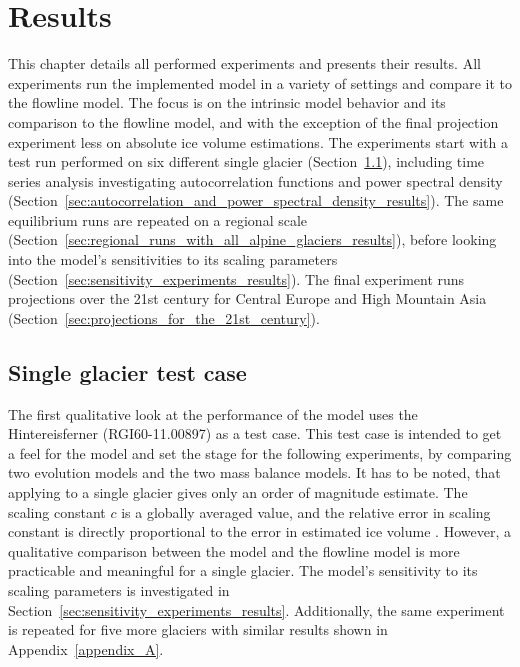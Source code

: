 \chapter{Results}\label{chap:results}
\thispagestyle{plain}

  This chapter details all performed experiments and presents their results. All experiments run the implemented \vas{} model in a variety of settings and compare it to the flowline model. The focus is on the intrinsic model behavior and its comparison to the flowline model, and with the exception of the final projection experiment less on absolute ice volume estimations. The experiments start with a test run performed on six different single glacier (Section~\ref{sec:single_glacier_test_case_results}), including time series analysis investigating autocorrelation functions and power spectral density (Section~\ref{sec:autocorrelation_and_power_spectral_density_results}). The same equilibrium runs are repeated on a regional scale (Section~\ref{sec:regional_runs_with_all_alpine_glaciers_results}), before looking into the model's sensitivities to its scaling parameters (Section~\ref{sec:sensitivity_experiments_results}).
  The final experiment runs projections over the 21st century for Central Europe and High Mountain Asia (Section~\ref{sec:projections_for_the_21st_century}).

  \section{Single glacier test case} %
  \label{sec:single_glacier_test_case_results}

    The first qualitative look at the performance of the \vas{} model uses the Hintereisferner (RGI60-11.00897) as a test case. This test case is intended to get a feel for the model and set the stage for the following experiments, by comparing two evolution models and the two mass balance models. 
    It has to be noted, that applying \vas{} to a single glacier gives only an order of magnitude estimate. The scaling constant $c$ is a globally averaged value, and the relative error in scaling constant is directly proportional to the error in estimated ice volume \citep{Bahr2015}. However, a qualitative comparison between the \vas{} model and the flowline model is more practicable and meaningful for a single glacier. The model's sensitivity to its scaling parameters is investigated in Section~\ref{sec:sensitivity_experiments_results}. Additionally, the same experiment is repeated for five more glaciers with similar results shown in Appendix~\ref{appendix_A}.

